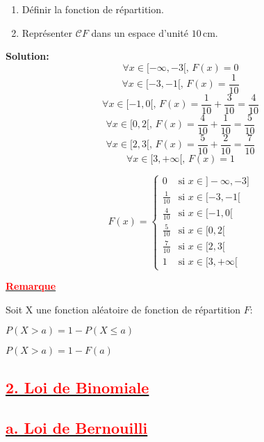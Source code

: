 \documentclass[12pt,a4paper]{article}
\begin{document}
\begin{enumerate}
    \item Définir la fonction de répartition.
    \item Représenter \( \mathcal{C}F \) dans un espace d’unité \( 10 \, \text{cm} \).
\end{enumerate}

\textbf{Solution:} \\

\[
\forall x \in  [-\infty, -3[, \, F( x ) = 0
\]
\[
\forall x \in [-3, -1[, \, F( x ) = \frac{1}{10}
\]
\[
\forall x \in [-1, 0[, \, F( x ) = \frac{1}{10} + \frac{3}{10} = \frac{4}{10}
\]
\[
\forall x \in [0, 2[, \, F( x ) = \frac{4}{10} + \frac{1}{10} = \frac{5}{10}
\]
\[
\forall x \in [2, 3[, \, F( x ) = \frac{5}{10} + \frac{2}{10} = \frac{7}{10}
\]
\[
\forall x \in [3, +\infty[, \, F( x ) = 1
\]

\[
F(x) =
\begin{cases}
0 & \text{si } x \in  ]-\infty, -3] \\
\frac{1}{10} & \text{si } x \in [-3, -1[ \\
\frac{4}{10} & \text{si } x \in [-1, 0[ \\
\frac{5}{10} & \text{si } x \in [0, 2[ \\
\frac{7}{10} & \text{si } x \in [2, 3[ \\
1 & \text{si } x \in [3, +\infty[
\end{cases}
\]

\underline{\textbf{\textcolor{red}{Remarque}}}

Soit X une fonction aléatoire de fonction de répartition \( F: \)

$P(X > a) = 1 - P(X \leq a)$

$P(X > a) = 1 - F(a)$

\begin{figure}[h!]
    \centering
    \label{fig:courbe_f}
\end{figure}


\subsection*{\underline{\textbf{\textcolor{red}{2. Loi de Binomiale}}}}

\subsection*{\underline{\textbf{\textcolor{red}{a. Loi de Bernouilli}}}}
\end{document}
